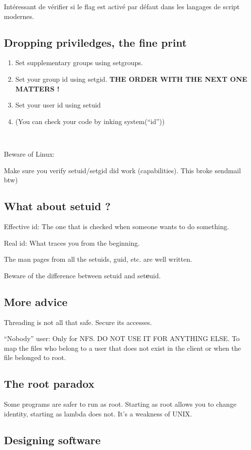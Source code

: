 \documentclass[a4paper,11pt]{article}
\newcommand{\li}{\item}
\begin{document}
Intéressant de vérifier si le flag est activé par défaut dans les langages de
script modernes.

\subsection{Dropping priviledges, the fine print}

\begin{enumerate}
\li Set supplementary groups using setgroups.
\li Set your group id using setgid. \textbf{THE ORDER WITH THE NEXT ONE MATTERS !}
\li Set your user id using setuid
\li (You can check your code by inking system(``id''))
\end{enumerate}

\

Beware of Linux:

Make sure you verify setuid/setgid did work (capabilities). This broke sendmail
btw)

\subsection{What about setuid ?}

Effective id: The one that is checked when someone wants to do something.

Real id: What traces you from the beginning.

The man pages from all the setuids, guid, etc. are well written.

Beware of the difference between setuid and set\textbf{e}uid.

\subsection{More advice}

Threading is not all that safe. Secure its accesses.

``Nobody'' user: Only for NFS. DO NOT USE IT FOR ANYTHING ELSE. To map the files
who belong to a user that does not exist in the client or when the file belonged
to root.

\subsection{The root paradox}

Some programs are safer to run as root. Starting as root allows you to change
identity, starting as lambda does not. It's a weakness of UNIX.

\subsection{Designing software}
\end{document}
